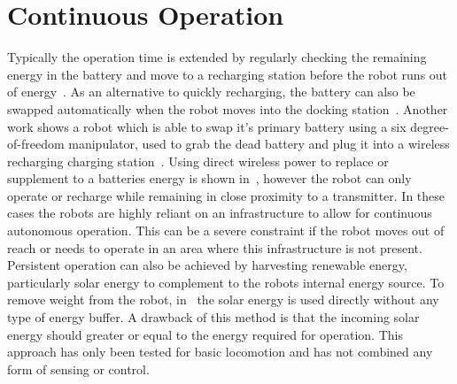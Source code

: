 \section{Continuous Operation}
\label{sec:continous_operation}

Typically the operation time is extended by regularly checking the remaining energy in the battery and move to a recharging station before the robot runs out of energy~\cite{pickem_icra_2015, rubenstein_icra_2012}.
As an alternative to quickly recharging, the battery can also be swapped automatically when the robot moves into the docking station~\cite{kemal_mech_2015}.
Another work shows a robot which is able to swap it's primary battery using a six degree-of-freedom manipulator, used to grab the dead battery and plug it into a wireless recharging charging station~\cite{zhang_conel_2013}.
Using direct wireless power to replace or supplement to a batteries energy is shown in~\cite{karpelson_icra_2014}, however the robot can only operate or recharge while remaining in close proximity to a transmitter. 
In these cases the robots are highly reliant on an infrastructure to allow for continuous autonomous operation.
This can be a severe constraint if the robot moves out of reach or needs to operate in an area where this infrastructure is not present. 
Persistent operation can also be achieved by harvesting renewable energy, particularly solar energy to complement to the robots internal energy source. 
To remove weight from the robot, in~\cite{bruhwiler_iros_2015} the solar energy is used directly without any type of energy buffer. 
A drawback of this method is that the incoming solar energy should greater or equal to the energy required for operation. 
This approach has only been tested for basic locomotion and has not combined any form of sensing or control.




